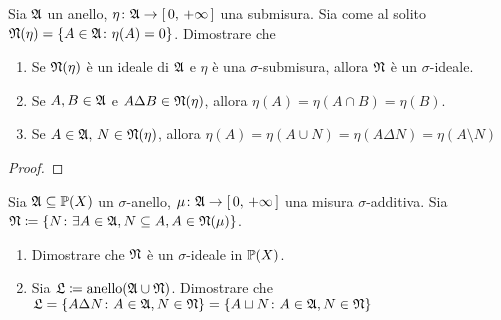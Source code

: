 \documentclass[../EserciziIstituzioniAnalisi.tex]{subfiles}
\begin{document}
\begin{exercise}[2016-10-20]
  Sia $\mathfrak A$ un anello, $\eta\colon\mathfrak A\to\left[\,0,\,+\infty\,\right]$ una submisura. Sia come al solito $\mathfrak N(\eta)=\left\{A\in\mathfrak A\colon\eta(A)=0\right\}$. Dimostrare che
  \begin{enumerate}
    \item Se $\mathfrak N(\eta)$ è un ideale di $\mathfrak A$ e $\eta$ è una $\sigma$-submisura, allora $\mathfrak N$ è un $\sigma$-ideale.
    \item Se $A,B\in \mathfrak A$ e $A\Delta B\in \mathfrak N(\eta)$, allora $\eta(A)=\eta(A\cap B)=\eta(B)$.
    \item Se $A\in \mathfrak A,\, N\in \mathfrak N(\eta)$, allora $\eta(A)=\eta(A\cup N)=\eta(A\Delta N)=\eta(A\setminus N)$
  \end{enumerate}
\end{exercise}
\begin{proof}
  
\end{proof}
\begin{exercise}[2016-10-20]
  Sia $\mathfrak A\subseteq\mathbb P(X)$ un $\sigma$-anello, $\mu\colon \mathfrak A\to\left[\,0,\,+\infty\,\right]$ una misura $\sigma$-additiva.
  Sia $\mathfrak N\coloneqq\left\{N\colon\exists A\in \mathfrak A, N\subseteq A, A\in \mathfrak N(\mu)\right\}$.

  \begin{enumerate}
    \item Dimostrare che $\mathfrak N$ è un $\sigma$-ideale in $\mathbb P(X)$.
    \item Sia $\mathfrak L\coloneqq\operatorname{anello}(\mathfrak A\cup\mathfrak N)$. Dimostrare che $\mathfrak L=\left\{A\Delta N\colon A\in\mathfrak A,N\in\mathfrak N\right\}=\left\{A\sqcup N\colon A\in\mathfrak A,N\in\mathfrak N\right\}$ 
  \end{enumerate}
\end{exercise}
\end{document}
